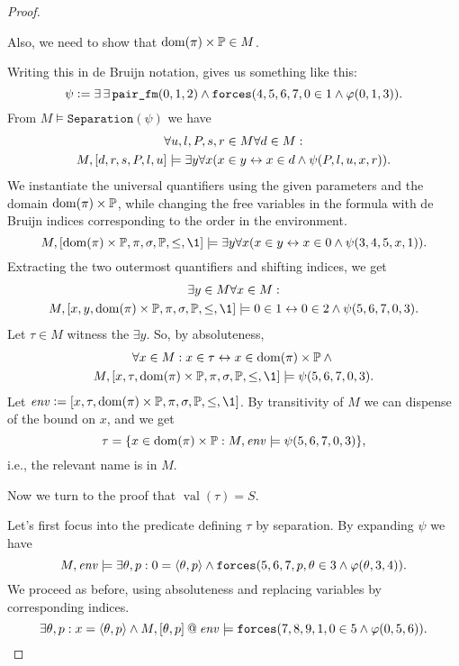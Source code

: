 \documentclass[11pt,english]{article}
\makeatletter
\renewcommand{\PP}{\mathbb{P}}
\newcommand{\forceisa}{\mathtt{forces}}
\newcommand{\concat}{\mathbin{@}}
\DeclareMathOperator{\val}{val}
\makeatother
\begin{document}
\begin{proof}
\begin{framed}
    Also, we need to show that $\dom(\pi)\times\PP\in M$.
  \end{framed}
  Writing this in de Bruijn notation, gives us something like this:
  \[
  \psi \defi  \exists\,\exists\,\verb|pair_fm|(0,1,2) \y
  \forceisa(4,5,6,7,0\in 1\y\phi(0,1,3)).
  \]
  From $M\models \mathtt{Separation}(\psi)$ we have
  \begin{multline*}
    \forall u,l,P,s,r\in M \forall d\in M:\\ 
    M,[d,r,s,P,l,u] \models\exists y \forall x
    (x\in y \leftrightarrow x\in d \wedge \psi(P,l,u,x,r)).
  \end{multline*}
  We instantiate the universal quantifiers using the given parameters
  and the domain $\dom(\pi)\times\PP$, while changing the free variables in
  the formula with de Bruijn indices corresponding to the order in the
  environment.
  \[
  M,[\dom(\pi)\times\PP,\pi,\sig,\PP,\leq,\1] \models\exists y \forall x
  (x\in y \lsii x\in 0 \y \psi(3,4,5,x,1)).
  \]
  Extracting the two outermost quantifiers and shifting indices, we get
  \begin{multline*}
    \exists y\in M \forall x\in M: \\
    M,[x,y,\dom(\pi)\times\PP,\pi,\sig,\PP,\leq,\1] \models
    0\in 1 \lsii 0\in 2 \y \psi(5,6,7,0,3).
  \end{multline*}
  Let $\tau\in M$ witness the $\exists y$. So, by absoluteness,
  \begin{multline*}
    \forall x\in M: 
    x\in\tau \lsii  x\in\dom(\pi)\times\PP \y{}\\ 
  M,[x,\tau,\dom(\pi)\times\PP,\pi,\sig,\PP,\leq,\1] \models
  \psi(5,6,7,0,3).
  \end{multline*}
  Let $\mathit{env}\defi
  [x,\tau,\dom(\pi)\times\PP,\pi,\sig,\PP,\leq,\1]$. By transitivity
  of $M$ we can dispense of the bound on $x$, and we get
  \[
  \tau = \{x\in\dom(\pi)\times\PP :
  M, \mathit{env}\models
  \psi(5,6,7,0,3)\},
  \]
  i.e., the relevant name is in $M$.
  
  Now we turn to the proof that $\val(\tau)=S$.
  
  Let's first focus into the predicate defining $\tau$ by separation. By expanding $\psi$ we have
  \[
   M, \mathit{env}\models
   \exists \th,p : 0=\lb\th,p\rb \y
   \forceisa(5,6,7,p,\th\in 3\y\phi(\th,3,4)).
  \]
  We proceed as before, using absoluteness and replacing variables by
  corresponding indices.
  \[
  \exists \th,p : x =\lb\th,p\rb \y  M, [\th,p]\concat\mathit{env}\models
  \forceisa(7,8,9,1,0\in 5\y\phi(0,5,6)).
  \]
    

\end{proof}
\end{document}
